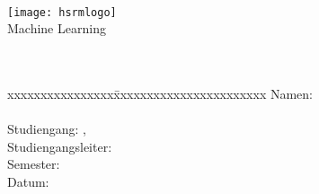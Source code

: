 \begin{center}

	\vspace{2.2cm}
	{\large \textbf{\university}}\\
	\vspace{2cm}
	
	\texttt{[image: hsrmlogo]}\\
	\vspace{2.8cm}	
	{\small Machine Learning}\\ 
	\vspace{1cm}
	\doublespacing
	{\Huge \textbf{\reporttitle}}\\ 
	\singlespacing 
	\vspace{1cm}
	{\large \reportsubtitle}\\ 
	\vspace{2.2cm}
	\onehalfspacing
	  
	\begin{tabbing}
		xxxxxxxxxxxxxxxx\=xxxxxxxxxxxxxxxxxxxxxxx\kill
		Namen: \> {\textbf{\studenta}} \\
		\>  \textbf{\studentb}\\
		Studiengang: \> \studiengang, \degree\\
		Studiengangsleiter: \> \prof \\
		{Semester}: \> \reportsemester  \\
		{Datum:} \> \handoverdate \\
	\end{tabbing}
	\singlespacing 

\end{center}  
